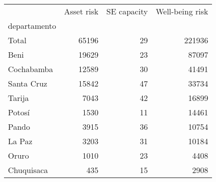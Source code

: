 \begin{tabular}{lrrr}
\toprule
{} &  Asset risk &  SE capacity &  Well-being risk \\
departamento &             &              &                  \\
\midrule
Total        &       65196 &           29 &           221936 \\
Beni         &       19629 &           23 &            87097 \\
Cochabamba   &       12589 &           30 &            41491 \\
Santa Cruz   &       15842 &           47 &            33734 \\
Tarija       &        7043 &           42 &            16899 \\
Potosí       &        1530 &           11 &            14461 \\
Pando        &        3915 &           36 &            10754 \\
La Paz       &        3203 &           31 &            10184 \\
Oruro        &        1010 &           23 &             4408 \\
Chuquisaca   &         435 &           15 &             2908 \\
\bottomrule
\end{tabular}
